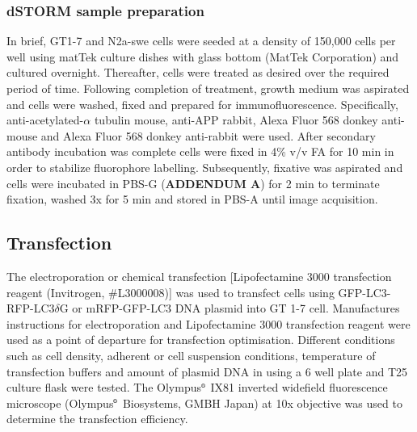 \subsubsection{dSTORM sample preparation}
In brief, GT1-7 and N2a-swe cells were seeded at a density of 150,000 cells per well using matTek culture dishes with glass bottom (MatTek Corporation) and cultured overnight. Thereafter, cells were treated as desired over the required period of time. Following completion of treatment, growth medium was aspirated and cells were washed, fixed and prepared for immunofluorescence. Specifically, anti-acetylated-$\alpha$ tubulin mouse, anti-APP rabbit, Alexa Fluor 568 donkey anti-mouse and Alexa Fluor 568 donkey anti-rabbit were used. After secondary antibody incubation was complete cells were fixed in 4\% v/v FA for 10 min in order to stabilize fluorophore labelling. Subsequently, fixative was aspirated and cells were incubated in PBS-G (\textbf{ADDENDUM A}) for 2 min to terminate fixation, washed 3x for 5 min and stored in PBS-A until image acquisition. 

\subsection{Transfection} 
The electroporation or chemical transfection [Lipofectamine 3000 transfection reagent (Invitrogen, \#L3000008)] was used to transfect cells using GFP-LC3-RFP-LC3$\delta$G or mRFP-GFP-LC3 DNA plasmid into GT 1-7 cell. Manufactures instructions for electroporation and Lipofectamine 3000 transfection reagent were used as a point of departure for transfection optimisation. Different conditions such as cell density, adherent or cell suspension conditions, temperature of transfection buffers and amount of plasmid DNA in using a 6 well plate and T25 culture flask were tested. The Olympus${\textsuperscript{\tiny{\textregistered}}}$ IX81 inverted widefield fluorescence microscope (Olympus${\textsuperscript{\tiny{\textregistered}}}$ Biosystems, GMBH Japan) at 10x objective was used to determine the transfection efficiency.

